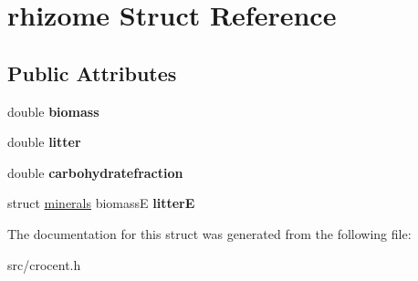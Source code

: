 \hypertarget{structrhizome}{\section{rhizome Struct Reference}
\label{structrhizome}
}
\subsection*{Public Attributes}
\begin{DoxyCompactItemize}
\item 
\hypertarget{structrhizome_a9e1b9008843ba043a69ffe1c69b9f68f}{double {\bfseries biomass}}\label{structrhizome_a9e1b9008843ba043a69ffe1c69b9f68f}

\item 
\hypertarget{structrhizome_a9b5f362e5505d0aee2f7654e75d09719}{double {\bfseries litter}}\label{structrhizome_a9b5f362e5505d0aee2f7654e75d09719}

\item 
\hypertarget{structrhizome_a8ae90fb8366d27717c1414b6631d7299}{double {\bfseries carbohydratefraction}}\label{structrhizome_a8ae90fb8366d27717c1414b6631d7299}

\item 
\hypertarget{structrhizome_ab7799f976e2fda8df390906b9113fcb4}{struct \hyperlink{structminerals}{minerals} biomass\-E {\bfseries litter\-E}}\label{structrhizome_ab7799f976e2fda8df390906b9113fcb4}

\end{DoxyCompactItemize}


The documentation for this struct was generated from the following file\-:\begin{DoxyCompactItemize}
\item 
src/crocent.\-h\end{DoxyCompactItemize}
